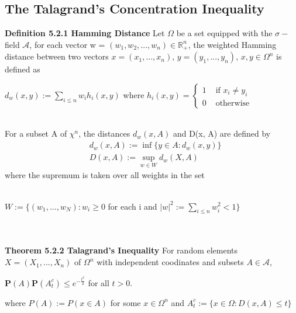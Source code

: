 \documentclass{article}
\begin{document}
\subsection{The Talagrand's Concentration Inequality}
\textbf{Definition 5.2.1 Hamming Distance} Let $\Omega$ be a set equipped with the $\sigma-$field $\mathcal{A}$, for each vector w = $(w_1, w_2,..., w_n) \in \mathbb{R}^n_+$, the weighted Hamming distance between two vectors $x = (x_1, ..., x_n)$, $y = (y_1,...,y_n)$, $x,y \in \Omega^n$ is defined as\\
\centerline{$d_w(x, y) := \sum\limits_{i \leq n} w_i h_i(x,y)$      where $h_i(x,y) = \begin{cases} 
      1 & \text{ if }x_i \neq y_i \\
      0 & \text{ otherwise}
   \end{cases}$}
\\
For a subset A of $\chi^n$, the distances $d_w(x, A)$ and D(x, A) are defined by
\begin{align*}
    &d_w(x, A) := \inf\{y \in A: d_w(x,y)\}\\
    &D(x, A) := \sup_{w\in W}d_w(X, A)
\end{align*}
where the supremum is taken over all weights in the set\\
\\
\centerline{$W:= \{(w_1, ..., w_N):w_i \geq 0$ for each i and $|w|^2 := \sum_{i\leq n}w_i^2 < 1\}$}
\\
\\
\textbf{Theorem 5.2.2 Talagrand's Inequality} For random elements $X = (X_1,..., X_n)$ of $\Omega^n$ with independent coodinates and subsets $A \in \mathcal{A}$, 
\begin{center}
    $\mathbf{P}(A)\mathbf{P}(A_t^c) \leq e^{-\frac{t^2}{4}}$ for all $t > 0$.
\end{center}
where $P(A) := P(x \in A)$ for some $x \in \Omega^n$ and $A_t^c := \{x\in\Omega:D(x, A) \leq t\}$
\end{document}
